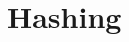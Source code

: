 
\ifsubfile
\pagestyle{plain}
\setcounter{chapter}{8}
\usepackage[
    parfill=30pt, %
]{parskip}


\fi
\chapter{Hashing}

\ifsubfile

\fi
